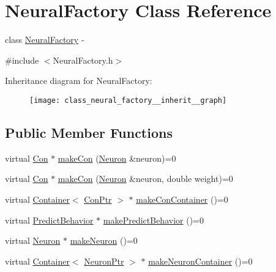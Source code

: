 \hypertarget{class_neural_factory}{
\section{NeuralFactory Class Reference}
\label{class_neural_factory}
}


class \hyperlink{class_neural_factory}{NeuralFactory} -\/  




{\ttfamily \#include $<$NeuralFactory.h$>$}



Inheritance diagram for NeuralFactory:
\nopagebreak
\begin{figure}[H]
\begin{center}
\leavevmode
\texttt{[image: class\_neural\_factory\_\_inherit\_\_graph]}
\end{center}
\end{figure}
\subsection*{Public Member Functions}
\begin{DoxyCompactItemize}
\item 
virtual \hyperlink{class_con}{Con} $\ast$ \hyperlink{class_neural_factory_ad7dacdd1ed0994f4a55612bd2d45ada2}{makeCon} (\hyperlink{class_neuron}{Neuron} \&neuron)=0
\item 
virtual \hyperlink{class_con}{Con} $\ast$ \hyperlink{class_neural_factory_a1f466a7f82020767cda89ae48a9852b7}{makeCon} (\hyperlink{class_neuron}{Neuron} \&neuron, double weight)=0
\item 
virtual \hyperlink{class_container}{Container}$<$ \hyperlink{_a_m_o_r_e_8h_a169bb8e5f26ce70bf2b10dec2fb5ee50}{ConPtr} $>$ $\ast$ \hyperlink{class_neural_factory_a0446aa979904fc0c5f6cda9bf1044100}{makeConContainer} ()=0
\item 
virtual \hyperlink{class_predict_behavior}{PredictBehavior} $\ast$ \hyperlink{class_neural_factory_ab84ed5dd9e48d8416ba6fb4aa3910629}{makePredictBehavior} ()=0
\item 
virtual \hyperlink{class_neuron}{Neuron} $\ast$ \hyperlink{class_neural_factory_a656b7663182769bcfd5ce5940e03b7cd}{makeNeuron} ()=0
\item 
virtual \hyperlink{class_container}{Container}$<$ \hyperlink{_a_m_o_r_e_8h_ac1ea936c2c7728eb382278131652fef4}{NeuronPtr} $>$ $\ast$ \hyperlink{class_neural_factory_a1f56d9485fe3669a79d5d5dc70be65af}{makeNeuronContainer} ()=0
\end{DoxyCompactItemize}


